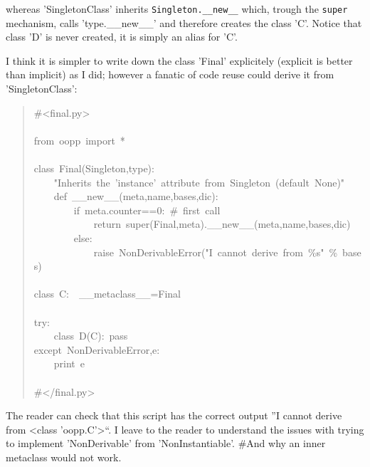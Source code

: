 \documentclass[10pt,english]{article}
\begin{document}
whereas 'SingletonClass' inherits \texttt{Singleton.{\_}{\_}new{\_}{\_}} which, trough
the \texttt{super} mechanism, calls 'type.{\_}{\_}new{\_}{\_}' and therefore creates
the class 'C'. Notice that class 'D' is never created, it is simply
an alias for 'C'.

I think it is simpler to write down the class 'Final' explicitely
(explicit is better than implicit) as I did; however a fanatic of code
reuse could derive it from 'SingletonClass':
\begin{quote}
\begin{ttfamily}\begin{flushleft}
\mbox{{\#}<final.py>}\\
\mbox{}\\
\mbox{from~oopp~import~*}\\
\mbox{}\\
\mbox{class~Final(Singleton,type):}\\
\mbox{~~~~"Inherits~the~'instance'~attribute~from~Singleton~(default~None)"}\\
\mbox{~~~~def~{\_}{\_}new{\_}{\_}(meta,name,bases,dic):}\\
\mbox{~~~~~~~~if~meta.counter==0:~{\#}~first~call}\\
\mbox{~~~~~~~~~~~~return~super(Final,meta).{\_}{\_}new{\_}{\_}(meta,name,bases,dic)}\\
\mbox{~~~~~~~~else:}\\
\mbox{~~~~~~~~~~~~raise~NonDerivableError("I~cannot~derive~from~{\%}s"~{\%}~bases)}\\
\mbox{~~}\\
\mbox{class~C:~~{\_}{\_}metaclass{\_}{\_}=Final}\\
\mbox{}\\
\mbox{try:}\\
\mbox{~~~~class~D(C):~pass}\\
\mbox{except~NonDerivableError,e:}\\
\mbox{~~~~print~e}\\
\mbox{}\\
\mbox{{\#}</final.py>}
\end{flushleft}\end{ttfamily}
\end{quote}

The reader can check that this script has the correct output 
''I cannot derive from {\textless}class 'oopp.C'{\textgreater}``. I leave to the reader
to understand the issues with trying to implement 'NonDerivable'
from 'NonInstantiable'. {\#}And why an inner metaclass would not work.
\end{document}
